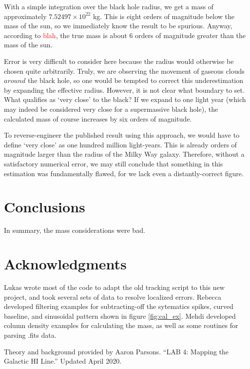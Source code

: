 \documentclass[12pt]{article}
\begin{document}
With a simple integration over the black hole radius, we get a mass of approximately $7.52497 \times 10^{22}$ kg. This is eight orders of magnitude below the mass of the sun, so we immediately know the result to be spurious. Anyway, according to \textcolor{red}{blah}, the true mass is about 6 orders of magnitude greater than the mass of the sun.

Error is very difficult to consider here because the radius would otherwise be chosen quite arbitrarily. Truly, we are observing the movement of gaseous clouds $around$ the black hole, so one would be tempted to correct this underestimation by expanding the effective radius. However, it is not clear what boundary to set. What qualifies as `very close' to the black? If we expand to one light year (which may indeed be considered very close for a supermassive black hole), the calculated mass of course increases by six orders of magnitude.

To reverse-engineer the published result using this approach, we would have to define `very close' as one hundred million light-years. This is already orders of magnitude larger than the radius of the Milky Way galaxy. Therefore, without a satisfactory numerical error, we may still conclude that something in this estimation was fundamentally flawed, for we lack even a distantly-correct figure.

\section{Conclusions}

\quad \quad In summary, the mass considerations were bad.

\section{Acknowledgments}

\quad \quad Lukas wrote most of the code to adapt the old tracking script to this new project, and took several sets of data to resolve localized errors. Rebecca developed filtering examples for subtracting-off the sytematics spikes, curved baseline, and sinusoidal pattern shown in figure \ref{fig:cal_ex}. Mehdi developed column density examples for calculating the mass, as well as some routines for parsing .fits data. 

Theory and background provided by Aaron Parsons. ``LAB 4: Mapping the Galactic HI Line.'' Updated April 2020.

\end{document}
